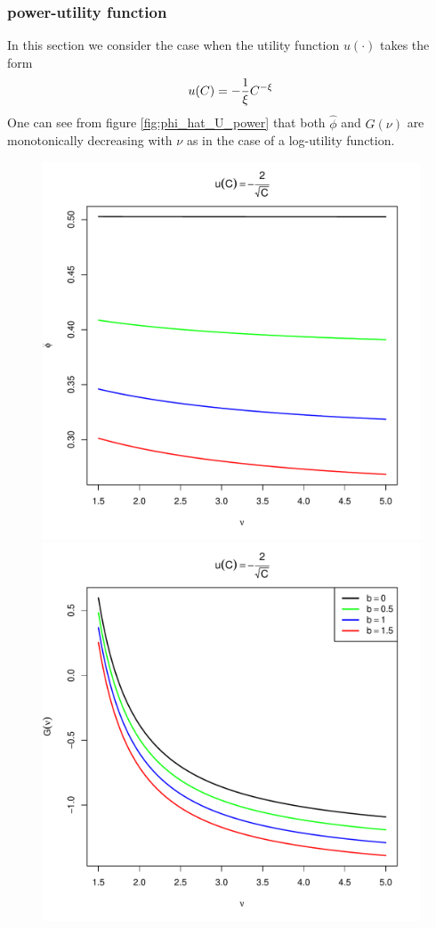 \documentclass[11pt,a4]{amsart}
\newcommand{\1}{{\mathbf 1}}
\begin{document}
\subsubsection{power-utility function}
In this section we consider the case when the utility function
$u(\cdot)$ takes the form
\[
u(C) = -{1 \over \xi} C^{-\xi}
\]
One can see from figure \ref{fig:phi_hat_U_power} that both $\hat
\phi$ and $G(\nu)$ are monotonically decreasing with $\nu$ as in the
case of a log-utility function.
\begin{figure}[htb!]
  \begin{minipage}{0.5\linewidth}
    \includegraphics[width=\textwidth]{phi_hat_b_t_power.pdf}
  \end{minipage}\hfill
  \begin{minipage}{0.5\linewidth}
    \includegraphics[width=\textwidth]{U_b_t_power.pdf}

\end{minipage}
\end{figure}
\end{document}
